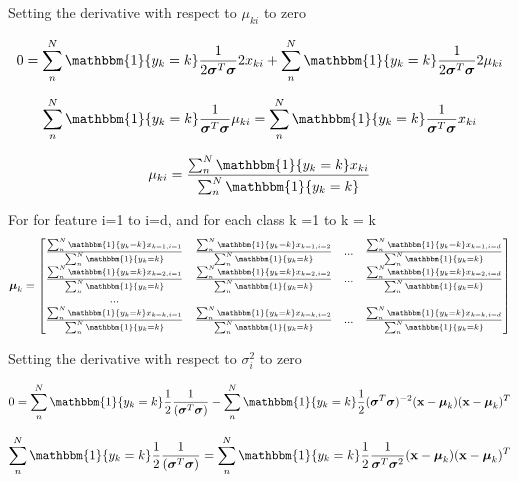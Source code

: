 \documentclass[12pt,letterpaper]{article} %
\newcommand{\bs}[1]{\bm{\mathrm{#1}}} %
\newcommand{\switch}[0]{\mathbbm{1}\{y_k=k\}}
\begin{document}
\subsection{}

Setting the derivative with respect to $\mu_{ki}$  to zero

\begin{equation*}
 0 = \sum^N_n\switch\frac{1}{2\bs{\sigma}^T\bs{\sigma}}2x_{ki} + \sum^N_n\switch\frac{1}{2\bs{\sigma}^T\bs{\sigma}}2\mu_{ki}
\end{equation*}

\begin{equation*}
\sum^N_n\switch\frac{1}{\bs{\sigma}^T\bs{\sigma}}\mu_{ki} = \sum^N_n\switch\frac{1}{\bs{\sigma}^T\bs{\sigma}}x_{ki} 
\end{equation*}

\begin{equation*}
 \mu_{ki} = \frac{ \sum^N_n\switch{}x_{ki} }{\sum^N_n\switch}
\end{equation*}


For for feature i=1 to i=d, and for each class k =1 to k = k
\begin{equation*}
\bs{\mu}_k = \begin{bmatrix} \frac{ \sum^N_n\switch{}x_{k=1,i=1} }{\sum^N_n\switch} & \frac{ \sum^N_n\switch{}x_{k=1,i=2} }{\sum^N_n\switch} & ... & \frac{ \sum^N_n\switch{}x_{k=1, i=d} }{\sum^N_n\switch}\\  \frac{ \sum^N_n\switch{}x_{k=2,i=1} }{\sum^N_n\switch} & \frac{ \sum^N_n\switch{}x_{k=2,i=2} }{\sum^N_n\switch} & ... & \frac{ \sum^N_n\switch{}x_{k=2, i=d} }{\sum^N_n\switch} \\ ... \\  \frac{ \sum^N_n\switch{}x_{k=k,i=1} }{\sum^N_n\switch} & \frac{ \sum^N_n\switch{}x_{k=k,i=2} }{\sum^N_n\switch} & ... & \frac{ \sum^N_n\switch{}x_{k=k, i=d} }{\sum^N_n\switch} \end{bmatrix}
\end{equation*}

\clearpage
Setting the derivative with respect to $\sigma^2_{i}$  to zero

\begin{equation*}
0 =\sum^N_n\switch\frac{1}{2}\frac{1}{(\bs{\sigma}^T\bs{\sigma})} - \sum^N_n\switch\frac{1}{2}(\bs{\sigma}^T\bs{\sigma})^{-2}(\bs{x}-\bs{\mu}_k)(\bs{x}-\bs{\mu}_k)^T
 \end{equation*}
 
 
 \begin{equation*}
\sum^N_n\switch\frac{1}{2}\frac{1}{(\bs{\sigma}^T\bs{\sigma})}  = \sum^N_n\switch\frac{1}{2}\frac{1}{\bs{\sigma}^T\bs{\sigma}^2}(\bs{x}-\bs{\mu}_k)(\bs{x}-\bs{\mu}_k)^T
 \end{equation*}
 
\end{document}
